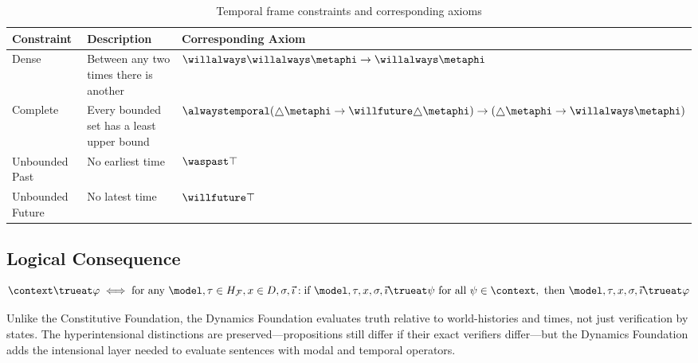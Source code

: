 \documentclass[../LogosReference.tex]{subfiles}
\begin{document}
\begin{table}[h]
	\centering
	\begin{tabular}{lll}
		\toprule
		\textbf{Constraint} & \textbf{Description}                      & \textbf{Corresponding Axiom}                                                                                    \\
		\midrule
		Dense               & Between any two times there is another    & $\willalways\willalways\metaphi \to \willalways\metaphi$                                                        \\
		Complete            & Every bounded set has a least upper bound & $\alwaystemporal(\always\metaphi \to \willfuture\always\metaphi) \to (\always\metaphi \to \willalways\metaphi)$ \\
		Unbounded Past      & No earliest time                          & $\waspast\top$                                                                                                  \\
		Unbounded Future    & No latest time                            & $\willfuture\top$                                                                                               \\
		\bottomrule
	\end{tabular}
	\caption{Temporal frame constraints and corresponding axioms}
	\label{tab:temporal-constraints}
\end{table}


\subsection{Logical Consequence}\label{sec:logical-consequence-core}

\begin{definition}\label{def:consequence-core}
	\[
		\context \trueat \metaA \iff \text{for any } \model, \history \in \historyspace, x \in D, \assignment, \tempindex: \text{if } \model, \history, x, \assignment, \tempindex \trueat \metaB \text{ for all } \metaB \in \context, \text{ then } \model, \history, x, \assignment, \tempindex \trueat \metaA
	\]
\end{definition}

\begin{remark}
	Unlike the Constitutive Foundation, the Dynamics Foundation evaluates truth relative to world-histories and times, not just verification by states.
	The hyperintensional distinctions are preserved---propositions still differ if their exact verifiers differ---but the Dynamics Foundation adds the intensional layer needed to evaluate sentences with modal and temporal operators.
\end{remark}
\end{document}
